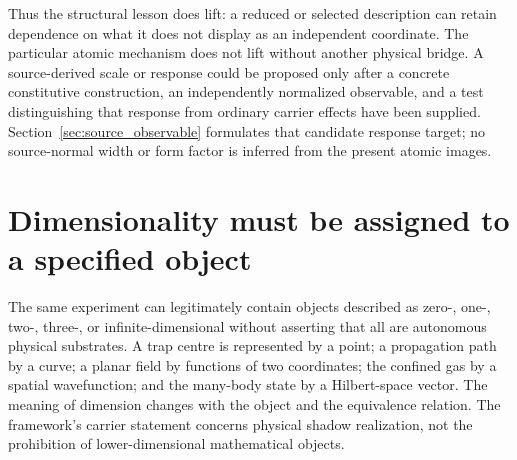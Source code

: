 \documentclass[11pt,a4paper]{article}
\theoremstyle{definition}
\theoremstyle{remark}
\begin{document}
Thus the structural lesson does lift: a reduced or selected description can retain dependence on what it does not display as an independent coordinate. The particular atomic mechanism does not lift without another physical bridge. A source-derived scale or response could be proposed only after a concrete constitutive construction, an independently normalized observable, and a test distinguishing that response from ordinary carrier effects have been supplied. Section~\ref{sec:source_observable} formulates that candidate response target; no source-normal width or form factor is inferred from the present atomic images.\cite{foundation,planck}

\section{Dimensionality must be assigned to a specified object}
\label{sec:types}
The same experiment can legitimately contain objects described as zero-, one-, two-, three-, or infinite-dimensional without asserting that all are autonomous physical substrates. A trap centre is represented by a point; a propagation path by a curve; a planar field by functions of two coordinates; the confined gas by a spatial wavefunction; and the many-body state by a Hilbert-space vector. The meaning of dimension changes with the object and the equivalence relation. The framework's carrier statement concerns physical shadow realization, not the prohibition of lower-dimensional mathematical objects.\cite{foundation,planck}
\end{document}
